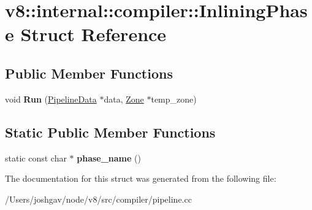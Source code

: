 \hypertarget{structv8_1_1internal_1_1compiler_1_1_inlining_phase}{}\section{v8\+:\+:internal\+:\+:compiler\+:\+:Inlining\+Phase Struct Reference}
\label{structv8_1_1internal_1_1compiler_1_1_inlining_phase}
\subsection*{Public Member Functions}
\begin{DoxyCompactItemize}
\item 
void {\bfseries Run} (\hyperlink{classv8_1_1internal_1_1compiler_1_1_pipeline_data}{Pipeline\+Data} $\ast$data, \hyperlink{classv8_1_1internal_1_1_zone}{Zone} $\ast$temp\+\_\+zone)\hypertarget{structv8_1_1internal_1_1compiler_1_1_inlining_phase_a4d3f51affb8b7a1578ae40efbdabc578}{}\label{structv8_1_1internal_1_1compiler_1_1_inlining_phase_a4d3f51affb8b7a1578ae40efbdabc578}

\end{DoxyCompactItemize}
\subsection*{Static Public Member Functions}
\begin{DoxyCompactItemize}
\item 
static const char $\ast$ {\bfseries phase\+\_\+name} ()\hypertarget{structv8_1_1internal_1_1compiler_1_1_inlining_phase_a3c0aa77760e05608df474499a1fb43f2}{}\label{structv8_1_1internal_1_1compiler_1_1_inlining_phase_a3c0aa77760e05608df474499a1fb43f2}

\end{DoxyCompactItemize}


The documentation for this struct was generated from the following file\+:\begin{DoxyCompactItemize}
\item 
/\+Users/joshgav/node/v8/src/compiler/pipeline.\+cc\end{DoxyCompactItemize}
